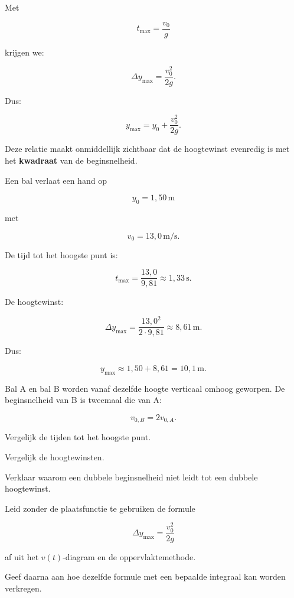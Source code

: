 \documentclass{ximera}
\begin{document}
Met

\[
t_{\max}=\frac{v_0}{g}
\]

krijgen we:

\[
\boxed{
\Delta y_{\max}
=
\frac{v_0^2}{2g}.
}
\]

Dus:

\[
\boxed{
y_{\max}
=
y_0+\frac{v_0^2}{2g}.
}
\]

Deze relatie maakt onmiddellijk zichtbaar dat de hoogtewinst
evenredig is met het \textbf{kwadraat} van de beginsnelheid.


\begin{voorbeeld}

Een bal verlaat een hand op

\[
y_0=1,50\,\mathrm{m}
\]

met

\[
v_0=13,0\,\mathrm{m/s}.
\]

De tijd tot het hoogste punt is:

\[
t_{\max}
=
\frac{13,0}{9,81}
\approx1,33\,\mathrm{s}.
\]

De hoogtewinst:

\[
\Delta y_{\max}
=
\frac{13,0^2}{2\cdot9,81}
\approx8,61\,\mathrm{m}.
\]

Dus:

\[
y_{\max}
\approx
1,50+8,61
=
10,1\,\mathrm{m}.
\]

\end{voorbeeld}


\begin{oefening}{\oefU\ESS}

Bal A en bal B worden vanaf dezelfde hoogte verticaal omhoog geworpen.
De beginsnelheid van B is tweemaal die van A:

\[
v_{0,B}=2v_{0,A}.
\]

\begin{question}
Vergelijk de tijden tot het hoogste punt.
\end{question}

\begin{question}
Vergelijk de hoogtewinsten.
\end{question}

\begin{question}
Verklaar waarom een dubbele beginsnelheid niet leidt tot een dubbele
hoogtewinst.
\end{question}

\end{oefening}


\begin{oefening}{\oefG}

Leid zonder de plaatsfunctie te gebruiken de formule

\[
\Delta y_{\max}=\frac{v_0^2}{2g}
\]

af uit het $v(t)$-diagram en de oppervlaktemethode.

Geef daarna aan hoe dezelfde formule met een bepaalde integraal kan
worden verkregen.

\end{oefening}
\end{document}
